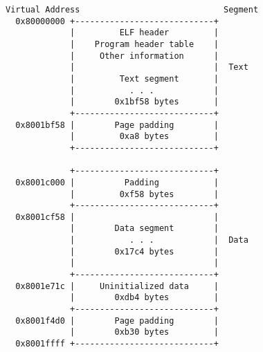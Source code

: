 \documentclass[english,11pt,twoside,toc=bib,toc=idx]{scrreprt}
\newcommand{\stackit}[2][l]{\setlength{\tabcolsep}{0mm}\begin{tabular}{#1}%
    #2\end{tabular}}
\newif\ifSkipTikZ
\begin{document}
\begin{figure}
  \centering
  \ifSkipTikZ
\begin{verbatim}
Virtual Address                             Segment
  0x80000000 +----------------------------+
             |         ELF header         |
             |    Program header table    |
             |     Other information      |
             |                            |  Text
             |         Text segment       |
             |           . . .            |
             |        0x1bf58 bytes       |
             +----------------------------+
  0x8001bf58 |        Page padding        |
             |         0xa8 bytes         |
             +----------------------------+

             +----------------------------+
  0x8001c000 |          Padding           |
             |         0xf58 bytes        |
             +----------------------------+
  0x8001cf58 |                            |
             |        Data segment        |
             |           . . .            |  Data
             |        0x17c4 bytes        |
             |                            |
             +----------------------------+
  0x8001e71c |     Uninitialized data     |
             |        0xdb4 bytes         |
             +----------------------------+
  0x8001f4d0 |        Page padding        |
             |        0xb30 bytes         |
  0x8001ffff +----------------------------+
\end{verbatim}
  \else
\end{figure}
\end{document}
